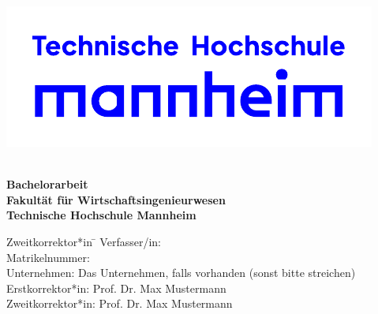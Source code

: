 \begin{titlepage}
		\vspace{-2cm}
		\centering\noindent\includegraphics[scale=1.0]{img/thmannheimlogo.pdf}

\vspace{3em}

\begin{center}
	{\textbf{\Large{}\TheThesisTitle}}\\[5em]
	{\textbf{\large{}Bachelorarbeit}}\\[2em]
	{\textbf{Fakultät für Wirtschaftsingenieurwesen}\\[.5em] \textbf{Technische Hochschule Mannheim}}
	
	\vspace{3em}
\vfill

\begin{minipage}{\textwidth}

\begin{tabbing}
	Zweitkorrektor*in \hspace{0.85cm}\=\kill
	Verfasser/in: \> \TheThesisAuthor \\[1.5mm]
	Matrikelnummer:  \\[1.5mm]
	Unternehmen: \> Das Unternehmen, falls vorhanden (sonst bitte streichen)  \\[1.5mm]
	Erstkorrektor*in: \> Prof. Dr. Max Mustermann \\[1.5mm]
	Zweitkorrektor*in: \> Prof. Dr. Max Mustermann \\[1.5mm]

\end{tabbing}
\end{minipage}

\end{center}

\end{titlepage}